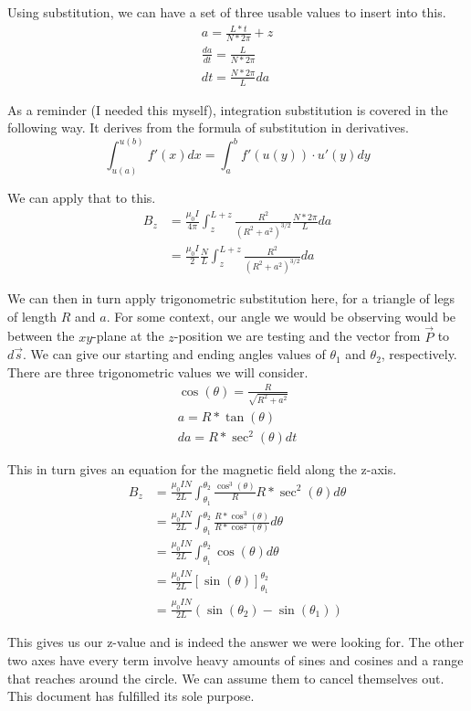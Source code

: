 \documentclass[12pt]{article}
\begin{document}
    Using substitution, we can have a set of three usable values to insert into this.
    \begin{gather}
        a = \frac{L*t}{N*2\pi} + z\\
        \frac{da}{dt} = \frac{L}{N*2\pi}\\
        dt  =   \frac{N*2\pi}{L} da
    \end{gather}

    As a reminder (I needed this myself), integration substitution is covered in the following way.
    It derives from the formula of substitution in derivatives.
    \begin{equation}
        \int_{u(a)}^{u(b)} f'(x) dx  =   \int_{a}^{b} f'(u(y)) \cdot u'(y) dy
    \end{equation}

    We can apply that to this.
    \begin{align}
        B_z &=  \frac{\mu_0 I}{4\pi} \int_{z}^{L + z} \frac{R^2}{\left(R^2 + a^2\right)^{3/2}} \frac{N * 2\pi}{L} da\\
            &=  \frac{\mu_0 I}{2} \frac{N}{L} \int_{z}^{L + z} \frac{R^2}{\left(R^2 + a^2\right)^{3/2}} da
    \end{align}

    We can then in turn apply trigonometric substitution here, for a triangle of legs of length $R$ and $a$. 
    For some context, our angle we would be observing would be between the $xy$-plane at the $z$-position we are testing and the vector from $\vec{P}$ to $d\vec{s}$.
    We can give our starting and ending angles values of $\theta_1$ and $\theta_2$, respectively. 
    There are three trigonometric values we will consider.
    \begin{gather}
        \cos(\theta) = \frac{R}{\sqrt{R^2 + a^2}}\\
        a = R*\tan(\theta)\\
        da = R*\sec^2(\theta) dt
    \end{gather}

    This in turn gives an equation for the magnetic field along the z-axis.
    \begin{align}
        B_z &=  \frac{\mu_0 I N}{2 L} \int_{\theta_1}^{\theta_2} \frac{\cos^3(\theta)}{R} R * \sec^2(\theta) d\theta\\
            &=  \frac{\mu_0 I N}{2 L} \int_{\theta_1}^{\theta_2} \frac{R*\cos^3(\theta)}{R*\cos^2(\theta)} d\theta\\
            &=  \frac{\mu_0 I N}{2 L} \int_{\theta_1}^{\theta_2} \cos(\theta) d\theta\\
            &=  \frac{\mu_0 I N}{2 L} \left[\sin(\theta)\right]_{\theta_1}^{\theta_2}\\
            &=  \frac{\mu_0 I N}{2 L} \left( \sin(\theta_2) - \sin(\theta_1) \right)
    \end{align}

    This gives us our z-value and is indeed the answer we were looking for.
    The other two axes have every term involve heavy amounts of sines and cosines and a range that reaches around the circle. 
    We can assume them to cancel themselves out.
    This document has fulfilled its sole purpose.
\end{document}
